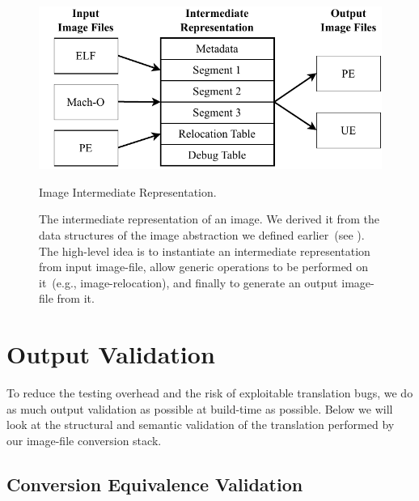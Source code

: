 \begin{figure}[htb]
  \centering
  \includegraphics{Figures/InterRep.pdf}
  \caption{Image Intermediate Representation.}
  \label{fig:inter_rep}
  \caption*{The intermediate representation of an \gls{image}. We derived it from the data structures of the \gls{image} abstraction we defined earlier~(see ). The high-level idea is to instantiate an intermediate representation from input \gls{image-file}, allow generic operations to be performed on it~(e.g., \gls{image-relocation}), and finally to generate an output \gls{image-file} from it.}
\end{figure}

\section{Output Validation}
\label{sec:out_validation}

To reduce the testing overhead and the risk of exploitable translation bugs, we do as much output validation as possible at build-time as possible. Below we will look at the structural and semantic validation of the translation performed by our \gls{image-file} conversion stack.

\subsection{Conversion Equivalence Validation}
\label{sec:conv_eq}

